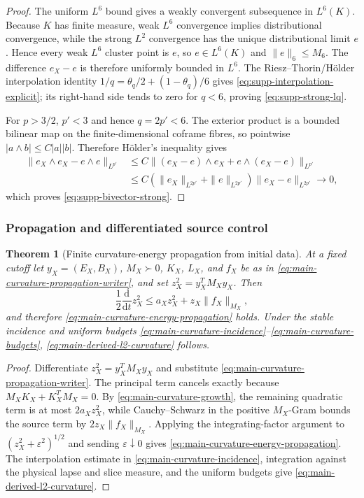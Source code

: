 \documentclass[11pt]{article}
\newtheorem{theorem}{Theorem}[section]
\theoremstyle{definition}
\theoremstyle{remark}
\newcommand{\dd}{\mathrm d}
\begin{document}
\begin{proof}
The uniform $L^6$ bound gives a weakly convergent subsequence in $L^6(K)$.
Because $K$ has finite measure, weak $L^6$ convergence implies distributional
convergence, while the strong $L^2$ convergence has the unique distributional
limit $e$.  Hence every weak $L^6$ cluster point is $e$, so $e\in L^6(K)$ and
$\|e\|_6\le M_6$.  The difference $e_X-e$ is therefore uniformly bounded in
$L^6$.  The Riesz--Thorin/H\"older interpolation identity
$1/q=\theta_q/2+(1-\theta_q)/6$ gives
\eqref{eq:supp-interpolation-explicit}; its right-hand side tends to zero for
$q<6$, proving \eqref{eq:supp-strong-lq}.

For $p>3/2$, $p'<3$ and hence $q=2p'<6$.  The exterior product is a bounded
bilinear map on the finite-dimensional coframe fibres, so pointwise
$|a\wedge b|\le C|a||b|$.  Therefore H\"older's inequality gives
\begin{align}
 \|e_X\wedge e_X-e\wedge e\|_{L^{p'}}
 &\le C\|(e_X-e)\wedge e_X+e\wedge(e_X-e)\|_{L^{p'}} \\
 &\le C(\|e_X\|_{L^{2p'}}+\|e\|_{L^{2p'}})
       \|e_X-e\|_{L^{2p'}}\longrightarrow0,
\end{align}
which proves \eqref{eq:supp-bivector-strong}.
\end{proof}

\subsubsection{Propagation and differentiated source control}

\begin{theorem}[Finite curvature-energy propagation from initial data]
\label{thm:supp-curvature-propagation}
At a fixed cutoff let $y_X=(E_X,B_X)$, $M_X\succ0$, $K_X$, $L_X$, and $f_X$
be as in \eqref{eq:main-curvature-propagation-writer}, and set
$z_X^2=y_X^TM_Xy_X$.  Then
\begin{equation}
 \frac12\frac{\dd}{\dd t}z_X^2
 \le a_Xz_X^2+z_X\|f_X\|_{M_X},
 \label{eq:supp-curvature-energy-differential}
\end{equation}
and therefore \eqref{eq:main-curvature-energy-propagation} holds.  Under the
stable incidence and uniform budgets
\eqref{eq:main-curvature-incidence}--\eqref{eq:main-curvature-budgets},
\eqref{eq:main-derived-l2-curvature} follows.
\end{theorem}

\begin{proof}
Differentiate $z_X^2=y_X^TM_Xy_X$ and substitute
\eqref{eq:main-curvature-propagation-writer}.  The principal term cancels
exactly because $M_XK_X+K_X^TM_X=0$.  By
\eqref{eq:main-curvature-growth}, the remaining quadratic term is at most
$2a_Xz_X^2$, while Cauchy--Schwarz in the positive $M_X$-Gram bounds the source
term by $2z_X\|f_X\|_{M_X}$.  Applying the integrating-factor argument to
$(z_X^2+\varepsilon^2)^{1/2}$ and sending $\varepsilon\downarrow0$ gives
\eqref{eq:main-curvature-energy-propagation}.  The interpolation estimate in
\eqref{eq:main-curvature-incidence}, integration against the physical lapse and
slice measure, and the uniform budgets give
\eqref{eq:main-derived-l2-curvature}.
\end{proof}
\end{document}
